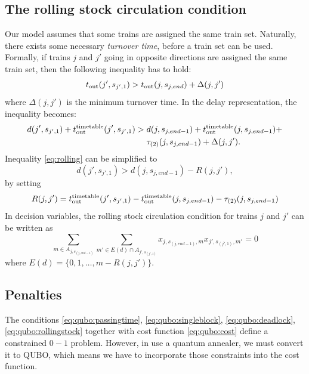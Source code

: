 \subsection{The rolling stock circulation condition}
Our model assumes that some trains are assigned the same train set. Naturally,
there exists some necessary \emph{turnover time}, before a train set can be
used. Formally, if trains $j$ and $j'$ going in opposite directions are
assigned the same train set, then the following inequality has to hold:
\begin{equation}
  t_\text{out}(j', s_{j',1}) > t_\text{out}(j, s_{j,end}) + \Delta(j, j')
\end{equation}
where $\Delta(j, j')$ is the minimum turnover time. In the delay
representation, the inequality becomes:
\begin{equation}
  \label{eq:rolling}
  \begin{split}
    d(j',s_{j',1}) + t_\text{out}^\text{timetable}(j',s_{j',1}) > & \; d(j, s_{j,end-1}) + t_\text{out}^\text{timetable}(j, s_{j,end-1}) + \\
    & \; \tau_{(2)}(j, s_{j,end-1}) + \Delta(j,j').
  \end{split}
\end{equation}
Inequality \eqref{eq:rolling} can be simplified to
\begin{equation}
  d(j',s_{j',1}) > d(j, s_{j,end-1}) - R(j,j'),
\end{equation}
by setting
\begin{equation}
  \label{eq:rolling2}
  R(j, j') = t_\text{out}^\text{timetable}(j',s_{j',1}) - t_\text{out}^\text{timetable}(j, s_{j,end-1}) - \tau_{(2)}(j,s_{j,end-1})
\end{equation}
In decision variables, the rolling stock circulation condition for trains $j$
and $j'$ can be written as
\begin{equation}
  \label{eq:qubo:rollingstock}
  \sum_{m \in A_{j, s_{(j, end-1)}}} \sum_{m' \in E(d) \cap A_{j',s_{(j',1)}}} x_{j,s_{(j,end-1)},m}x_{j', s_{(j',1)},m'} = 0
\end{equation}
where $E(d) = \{0, 1, \ldots, m-R(j, j')\}$.

\subsection{Penalties}
The conditions \eqref{eq:qubo:passingtime}, \eqref{eq:qubo:singleblock},
\eqref{eq:qubo:deadlock}, \eqref{eq:qubo:rollingstock} together with cost
function \eqref{eq:qubo:cost} define a constrained $0-1$ problem. However, in
use a quantum annealer, we must convert it to QUBO, which means we have to
incorporate those constraints into the cost function.


